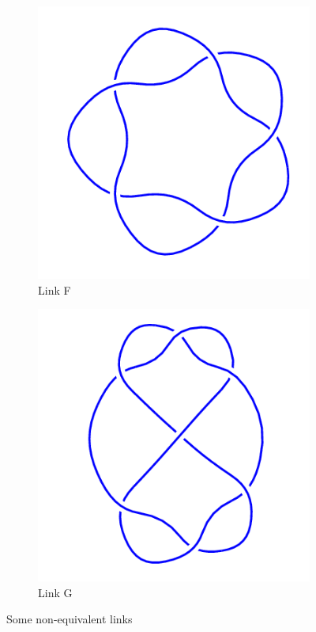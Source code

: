 \documentclass[12pt,letterpaper]{article}
\theoremstyle{definition}
\begin{document}
\begin{figure}[h!]
    \begin{subfigure}{.4\textwidth}
        \centering
        \includegraphics[width=\textwidth]{knotpics/5_1.png}
        \caption{Link F}
    \end{subfigure}
    \hspace{.5cm}
    \begin{subfigure}{.4\textwidth}
        \centering
        \includegraphics[width=\textwidth]{knotpics/7_4.png}
        \caption{Link G}
    \end{subfigure}
    \caption{Some non-equivalent links}
\end{figure}



\clearpage
\end{document}
